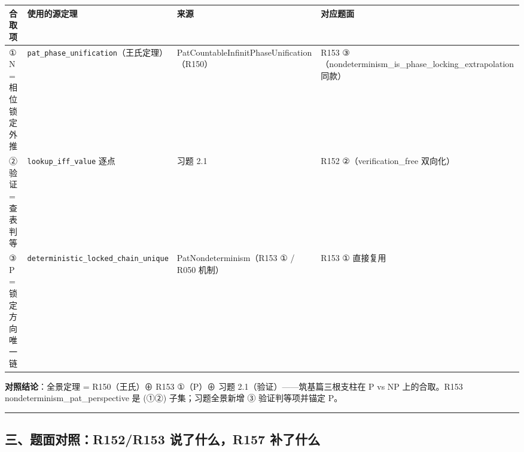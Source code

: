 \documentclass[
]{article}
\newcounter{none} %
\begin{document}
{\def\LTcaptype{none} %
\begin{longtable}[]{@{}
  >{\raggedright\arraybackslash}p{}
  >{\raggedright\arraybackslash}p{}
  >{\raggedright\arraybackslash}p{}
  >{\raggedright\arraybackslash}p{}@{}}
\toprule\noalign{}
\begin{minipage}[b]{\linewidth}\raggedright
合取项
\end{minipage} & \begin{minipage}[b]{\linewidth}\raggedright
使用的源定理
\end{minipage} & \begin{minipage}[b]{\linewidth}\raggedright
来源
\end{minipage} & \begin{minipage}[b]{\linewidth}\raggedright
对应题面
\end{minipage} \\
\midrule\noalign{}
\endhead
\bottomrule\noalign{}
\endlastfoot
① N = 相位锁定外推 & \texttt{pat\_phase\_unification}（王氏定理） &
PatCountableInfinitPhaseUnification（R150） & R153
③（nondeterminism\_is\_phase\_locking\_extrapolation 同款） \\
② 验证 = 查表判等 & \texttt{lookup\_iff\_value} 逐点 & 习题 2.1 & R152
②（verification\_free 双向化） \\
③ P = 锁定方向唯一链 & \texttt{deterministic\_locked\_chain\_unique} &
PatNondeterminism（R153 ① / R050 机制） & R153 ① 直接复用 \\
\end{longtable}
}

\textbf{对照结论}：全景定理 = R150（王氏）⊕ R153 ①（P）⊕ 习题
2.1（验证）------筑基篇三根支柱在 P vs NP 上的合取。R153
nondeterminism\_pat\_perspective 是 (①②) 子集；习题全景新增 ③
验证判等项并锚定 P。

\begin{center}\rule{0.5\linewidth}{0.5pt}\end{center}

\subsection{三、题面对照：R152/R153 说了什么，R157
补了什么}\label{ux4e09ux9898ux9762ux5bf9ux7167r152r153-ux8bf4ux4e86ux4ec0ux4e48r157-ux8865ux4e86ux4ec0ux4e48}
\end{document}
